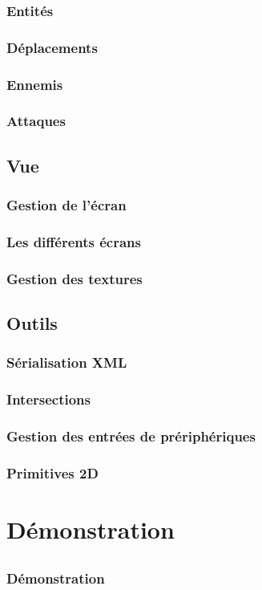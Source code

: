 \documentclass{beamer}
\begin{document}
\begin{frame}
\frametitle{Entités}
\end{frame}

\begin{frame}
\frametitle{Déplacements}
\end{frame}

\begin{frame}
\frametitle{Ennemis}
\end{frame}

\begin{frame}
\frametitle{Attaques}
\end{frame}

\subsection{Vue}
\begin{frame}
\frametitle{Gestion de l'écran}
\end{frame}

\begin{frame}
\frametitle{Les différents écrans}
\end{frame}

\begin{frame}
\frametitle{Gestion des textures}
\end{frame}

\subsection{Outils}
\begin{frame}
\frametitle{Sérialisation XML}
\end{frame}

\begin{frame}
\frametitle{Intersections}
\end{frame}

\begin{frame}
\frametitle{Gestion des entrées de prériphériques}
\end{frame}

\begin{frame}
\frametitle{Primitives 2D}
\end{frame}
\section{Démonstration}
\subsection{}
\begin{frame}
\frametitle{Démonstration}
\end{frame}
\end{document}
